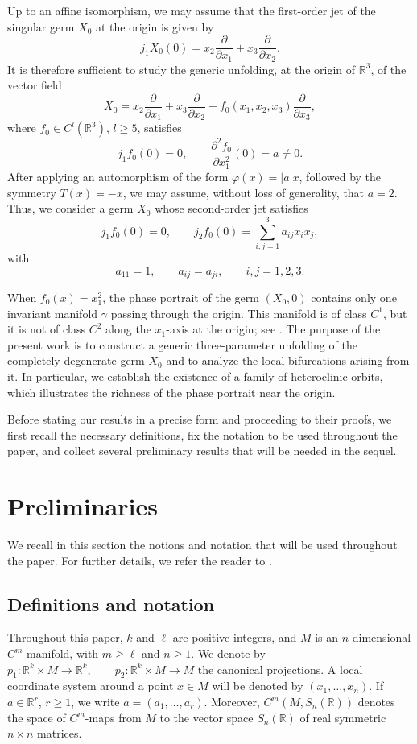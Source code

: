 \documentclass[12pt]{article}
\newtheorem{remark definition}{Remark Definition}[section]
\begin{document}
Up to an affine isomorphism, we may assume that the first-order jet of the
singular germ $X_0$ at the origin is given by
$$
j_1X_0(0)
=
x_2\frac{\partial}{\partial x_1}
+
x_3\frac{\partial}{\partial x_2}.
$$
It is therefore sufficient to study the generic unfolding, at the origin of
$\mathbb{R}^3$, of the vector field
$$
X_0
=
x_2\frac{\partial}{\partial x_1}
+
x_3\frac{\partial}{\partial x_2}
+
f_0(x_1,x_2,x_3)\frac{\partial}{\partial x_3},
$$
where $f_0\in C^l(\mathbb{R}^3)$, $l\geq 5$, satisfies
$$
j_1f_0(0)=0,
\qquad
\frac{\partial^2 f_0}{\partial x_1^2}(0)=a\neq 0.
$$
After applying an automorphism of the form $\varphi(x)=|a|x$, followed by the
symmetry $T(x)=-x$, we may assume, without loss of generality, that $a=2$.
Thus, we consider a germ $X_0$ whose second-order jet satisfies
$$
j_1f_0(0)=0,
\qquad
j_2f_0(0)=\sum_{i,j=1}^{3}a_{ij}x_ix_j,
$$
with
$$
a_{11}=1,
\qquad
a_{ij}=a_{ji},
\qquad
i,j=1,2,3.
$$

When $f_0(x)=x_1^2$, the phase portrait of the germ $(X_0,0)$ contains only
one invariant manifold $\gamma$ passing through the origin. This manifold is of
class $C^1$, but it is not of class $C^2$ along the $x_1$-axis at the origin;
see \cite{iv}. The purpose of the present work is to construct a generic
three-parameter unfolding of the completely degenerate germ $X_0$ and to
analyze the local bifurcations arising from it. In particular, we establish the
existence of a family of heteroclinic orbits, which illustrates the richness of
the phase portrait near the origin.

Before stating our results in a precise form and proceeding to their
proofs, we first recall the necessary definitions, fix the notation to be
used throughout the paper, and collect several preliminary results that
will be needed in the sequel.
	       	
	\section{Preliminaries}
	\label{Sect2_GPU}
	We recall in this section the notions and notation that will be used throughout
	the paper. For further details, we refer the reader to
	\cite{FR,GP,PL,i,iv,v}.
	
	\subsection{Definitions and notation}
	
	Throughout this paper, $k$ and $\ell$ are positive integers, and $M$ is an
	$n$-dimensional $C^m$-manifold, with $m\geq \ell$ and $n\geq 1$. We denote by
	$
	p_1:\mathbb{R}^k\times M\longrightarrow \mathbb{R}^k,
	\qquad
	p_2:\mathbb{R}^k\times M\longrightarrow M
	$
	the canonical projections. A local coordinate system around a point $x\in M$
	will be denoted by $(x_1,\dots,x_n)$. If $a\in \mathbb{R}^r$, $r\geq 1$, we
	write
	$
	a=(a_1,\dots,a_r).
	$
	Moreover, $C^m(M,S_n(\mathbb{R}))$ denotes the space of $C^m$-maps from $M$
	to the vector space $S_n(\mathbb{R})$ of real symmetric $n\times n$ matrices.
	
\end{document}
